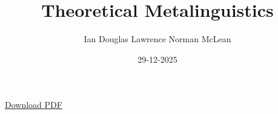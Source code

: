 \documentclass[12pt]{report}
\title{Theoretical Metalinguistics}
\author{Ian Douglas Lawrence Norman McLean}
\date{29-12-2025}
\begin{document}
\hypersetup{pageanchor=false}
\maketitle
\hypersetup{pageanchor=true}

\begin{center}
\href{main.pdf}{Download PDF}
\end{center}

\tableofcontents
















\end{document}
